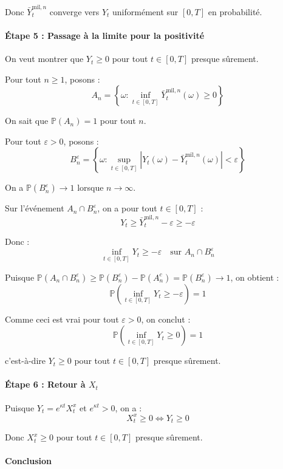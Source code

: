 \documentclass[12pt,a4paper]{article}
\theoremstyle{definition}
\theoremstyle{remark}
\newcommand{\Prob}{\mathbb{P}}
\newcommand{\supt}[1]{\sup_{t \in #1}}
\begin{document}
Donc $\bar{Y}_t^{\text{mil},n}$ converge vers $Y_t$ uniformément sur $[0,T]$ en probabilité.

\paragraph{Étape 5 : Passage à la limite pour la positivité}

On veut montrer que $Y_t \geq 0$ pour tout $t \in [0,T]$ presque sûrement.

Pour tout $n \geq 1$, posons :
\[
A_n = \left\{\omega : \inf_{t \in [0,T]} \bar{Y}_t^{\text{mil},n}(\omega) \geq 0\right\}
\]

On sait que $\Prob(A_n) = 1$ pour tout $n$.

Pour tout $\varepsilon > 0$, posons :
\[
B_n^\varepsilon = \left\{\omega : \supt{[0,T]} |Y_t(\omega) - \bar{Y}_t^{\text{mil},n}(\omega)| < \varepsilon\right\}
\]

On a $\Prob(B_n^\varepsilon) \to 1$ lorsque $n \to \infty$.

Sur l'événement $A_n \cap B_n^\varepsilon$, on a pour tout $t \in [0,T]$ :
\[
Y_t \geq \bar{Y}_t^{\text{mil},n} - \varepsilon \geq -\varepsilon
\]

Donc :
\[
\inf_{t \in [0,T]} Y_t \geq -\varepsilon \quad \text{sur } A_n \cap B_n^\varepsilon
\]

Puisque $\Prob(A_n \cap B_n^\varepsilon) \geq \Prob(B_n^\varepsilon) - \Prob(A_n^c) = \Prob(B_n^\varepsilon) \to 1$, on obtient :
\[
\Prob\left(\inf_{t \in [0,T]} Y_t \geq -\varepsilon\right) = 1
\]

Comme ceci est vrai pour tout $\varepsilon > 0$, on conclut :
\[
\Prob\left(\inf_{t \in [0,T]} Y_t \geq 0\right) = 1
\]

c'est-à-dire $Y_t \geq 0$ pour tout $t \in [0,T]$ presque sûrement.

\paragraph{Étape 6 : Retour à $X_t$}

Puisque $Y_t = e^{\kappa t}X_t^x$ et $e^{\kappa t} > 0$, on a :
\[
X_t^x \geq 0 \iff Y_t \geq 0
\]

Donc $X_t^x \geq 0$ pour tout $t \in [0,T]$ presque sûrement.

\paragraph{Conclusion}
\end{document}
